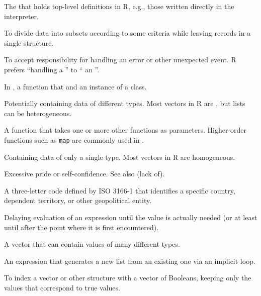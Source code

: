 \begin{description}
The  that holds top-level definitions in R,
e.g.,
those written directly in the interpreter.

To divide data into subsets according to some criteria
while leaving records in a single structure.

To accept responsibility for handling an error
or other unexpected event.
R prefers ``handling a ''
to `` an ''.

In ,
a function that  and 
an instance of a class.

Potentially containing data of different types.
Most vectors in R are ,
but lists can be heterogeneous.

A function that takes one or more other functions as parameters.
Higher-order functions such as \texttt{map} are commonly used in .

Containing data of only a single type.
Most vectors in R are homogeneous.

Excessive pride or self-confidence.
See also  (lack of).

A three-letter code defined by ISO 3166-1 that identifies a specific country,
dependent territory,
or other geopolitical entity.

Delaying evaluation of an expression until the value is actually needed
(or at least until after the point where it is first encountered).

A vector that can contain values of many different types.

An expression that generates a new list from an existing one via an implicit loop.

To index a vector or other structure with a vector of Booleans,
keeping only the values that correspond to true values.


\end{description}
